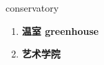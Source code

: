 
\begin{frame}
{\huge conservatory}
\begin{center}
\begin{enumerate}\Large
  \item \textbf{温室 greenhouse}
  \item \textbf{艺术学院}
\end{enumerate}
\end{center}
\end{frame}
